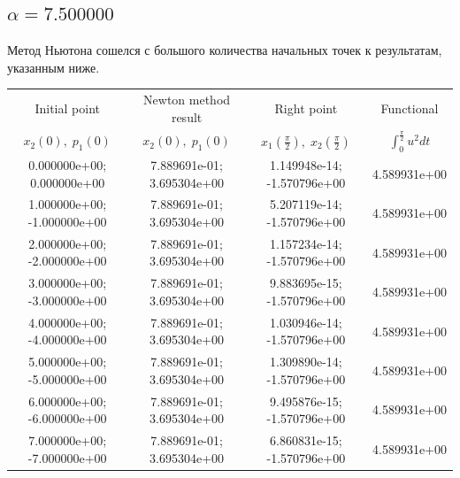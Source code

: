 \documentclass[titlepage]{article}
\def\l{\left}
\def\r{\right}
\begin{document}
\subsection{$\alpha = 7.500000$} 
Метод Ньютона сошелся с большого количества начальных точек к результатам, указанным ниже. \\ 
\begin{tabular}{ | c | c | c | c |} 
\hline 
Initial point  & Newton method result & Right point & Functional 
 \\ $x_2(0), \; p_1(0)$ & $x_2(0), \; p_1(0)$ & $x_1\l(\frac{\pi}{2}\r), \; x_2\l(\frac{\pi}{2}\r)$ & $\int_{0}^{\frac{\pi}{2}}u^2dt$  \\ \hline 
0.000000e+00; 0.000000e+00 & 7.889691e-01; 3.695304e+00 & 1.149948e-14; -1.570796e+00 & 4.589931e+00 \\ \hline 
1.000000e+00; -1.000000e+00 & 7.889691e-01; 3.695304e+00 & 5.207119e-14; -1.570796e+00 & 4.589931e+00 \\ \hline 
2.000000e+00; -2.000000e+00 & 7.889691e-01; 3.695304e+00 & 1.157234e-14; -1.570796e+00 & 4.589931e+00 \\ \hline 
3.000000e+00; -3.000000e+00 & 7.889691e-01; 3.695304e+00 & 9.883695e-15; -1.570796e+00 & 4.589931e+00 \\ \hline 
4.000000e+00; -4.000000e+00 & 7.889691e-01; 3.695304e+00 & 1.030946e-14; -1.570796e+00 & 4.589931e+00 \\ \hline 
5.000000e+00; -5.000000e+00 & 7.889691e-01; 3.695304e+00 & 1.309890e-14; -1.570796e+00 & 4.589931e+00 \\ \hline 
6.000000e+00; -6.000000e+00 & 7.889691e-01; 3.695304e+00 & 9.495876e-15; -1.570796e+00 & 4.589931e+00 \\ \hline 
7.000000e+00; -7.000000e+00 & 7.889691e-01; 3.695304e+00 & 6.860831e-15; -1.570796e+00 & 4.589931e+00 \\ \hline 
\end{tabular} 
\end{document}
